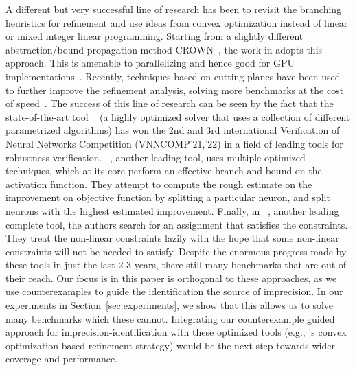 

\medskip

{A different but very successful line of research has been to revisit the branching heuristics for refinement and use ideas from convex optimization instead of linear or mixed integer linear programming. Starting from a slightly different abstraction/bound propagation method CROWN~\cite{zhang2018efficient}, the work in \cite{wang2021beta} adopts this approach. This is amenable to parallelizing and hence good for GPU implementations~\cite{xu2020fast}. Recently, techniques based on cutting planes have been used to further improve the refinement analysis, solving more benchmarks at the cost of speed~\cite{zhang2022general}. The success of this line of research can be seen by the fact that the state-of-the-art tool \alphabeta{}~\cite{alphabetacrown} (a highly optimized solver that uses a collection of different parametrized algorithms) has won the 2nd and 3rd international Verification of Neural Networks Competition (VNNCOMP'21,'22) in a field of leading tools for robustness verification. \ovaltool{}~\cite{bunel2020branch}, another leading tool, uses multiple optimized techniques, which at its core perform an effective branch and bound on the \relu{} activation function. They attempt to compute the rough estimate on the improvement on objective function by splitting a particular neuron, and split neurons with the highest estimated improvement. Finally, in \marabou{}~\cite{katz2019marabou}, another leading complete tool, the authors search for an assignment that satisfies the constraints. They treat the non-linear constraints lazily with the hope that some non-linear constraints will not be needed to satisfy. Despite the enormous progress made by these tools in just the last 2-3 years, there still many benchmarks that are out of their reach. %
Our focus is in this paper is orthogonal to these approaches, as we use counterexamples to guide the identification the source of imprecision. In our experiments in Section~\ref{sec:experiments}, we show that this allows us to solve many benchmarks which these cannot. Integrating our counterexample guided approach for imprecision-identification with these optimized tools (e.g., \alphabeta{}'s convex optimization based refinement strategy) would be the next step towards wider coverage and performance.

}
